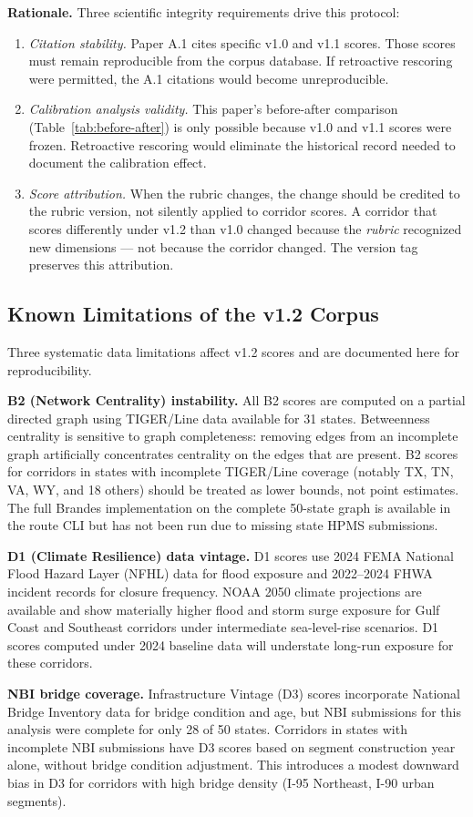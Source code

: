 \textbf{Rationale.} Three scientific integrity requirements drive this protocol:

\begin{enumerate}
  \item \textit{Citation stability.} Paper A.1 \citep{ROUTE_A1} cites specific v1.0 and v1.1 scores. Those scores must remain reproducible from the corpus database. If retroactive rescoring were permitted, the A.1 citations would become unreproducible.
  \item \textit{Calibration analysis validity.} This paper's before-after comparison (Table~\ref{tab:before-after}) is only possible because v1.0 and v1.1 scores were frozen. Retroactive rescoring would eliminate the historical record needed to document the calibration effect.
  \item \textit{Score attribution.} When the rubric changes, the change should be credited to the rubric version, not silently applied to corridor scores. A corridor that scores differently under v1.2 than v1.0 changed because the \textit{rubric} recognized new dimensions --- not because the corridor changed. The version tag preserves this attribution.
\end{enumerate}

\subsection{Known Limitations of the v1.2 Corpus}

Three systematic data limitations affect v1.2 scores and are documented here for reproducibility.

\textbf{B2 (Network Centrality) instability.} All B2 scores are computed on a partial directed graph using TIGER/Line data available for 31 states. Betweenness centrality is sensitive to graph completeness: removing edges from an incomplete graph artificially concentrates centrality on the edges that are present. B2 scores for corridors in states with incomplete TIGER/Line coverage (notably TX, TN, VA, WY, and 18 others) should be treated as lower bounds, not point estimates. The full Brandes implementation on the complete 50-state graph is available in the route CLI but has not been run due to missing state HPMS submissions.

\textbf{D1 (Climate Resilience) data vintage.} D1 scores use 2024 FEMA National Flood Hazard Layer (NFHL) data for flood exposure and 2022--2024 FHWA incident records for closure frequency. NOAA 2050 climate projections are available and show materially higher flood and storm surge exposure for Gulf Coast and Southeast corridors under intermediate sea-level-rise scenarios. D1 scores computed under 2024 baseline data will understate long-run exposure for these corridors.

\textbf{NBI bridge coverage.} Infrastructure Vintage (D3) scores incorporate National Bridge Inventory data for bridge condition and age, but NBI submissions for this analysis were complete for only 28 of 50 states. Corridors in states with incomplete NBI submissions have D3 scores based on segment construction year alone, without bridge condition adjustment. This introduces a modest downward bias in D3 for corridors with high bridge density (I-95 Northeast, I-90 urban segments).
